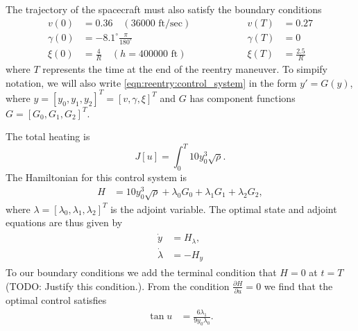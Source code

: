 The trajectory of the spacecraft must also satisfy the boundary conditions
% 
\begin{equation}
  \begin{split}
    v(0) &= 0.36 \quad (36000 \text{ ft/sec})\\
    \gamma(0) &= -8.1^\circ \frac{\pi}{180^\circ}\\
    \xi(0)&= \frac{4}{R}\quad (h = 400000 \text{ ft})
  \end{split} 
\quad \quad \quad \quad \quad
  \begin{split}
    v(T) &= 0.27\\
    \gamma(T) &= 0 \\
	\xi(T)&= \frac{2.5}{R}
  \end{split} \label{eqn:reentry:BCs}
\end{equation}
where $T$ represents the time at the end of the reentry maneuver. 
To simpify notation, we will also write \eqref{eqn:reentry:control_system} in the form $y' = G(y)$, where $y = [y_0, y_1, y_2]^T=[v,\gamma, \xi]^T$ and $G$ has component functions $G = [G_0, G_1, G_2]^T$. 

The total heating is 
\[
J[u] = \int_0^T 10y_0^3 \sqrt{\rho}.
\]
The Hamiltonian for this control system is 
\begin{align}
H &=  10y_0^3 \sqrt{\rho} + \lambda_0G_0 + \lambda_1G_1 + \lambda_2G_2,
\end{align}
where $\lambda = [\lambda_0,\lambda_1,\lambda_2]^T$ is the adjoint variable. 
The optimal state and adjoint equations are thus given by 
\begin{align}
\begin{split}
	\dot{y} &= H_{\lambda},\\
	\dot{\lambda} &= -H_{y} \label{eqn:reentry:full_system}
\end{split}
\end{align}
To our boundary conditions we add the terminal condition that $H = 0$ at $t = T$ (TODO: Justify this condition.).  From the condition $\frac{\partial H}{\partial u} = 0$ we find that the optimal control satisfies 
\begin{align}
\tan u &= \frac{6\lambda_1}{9y_0\lambda_0}.
\end{align}


